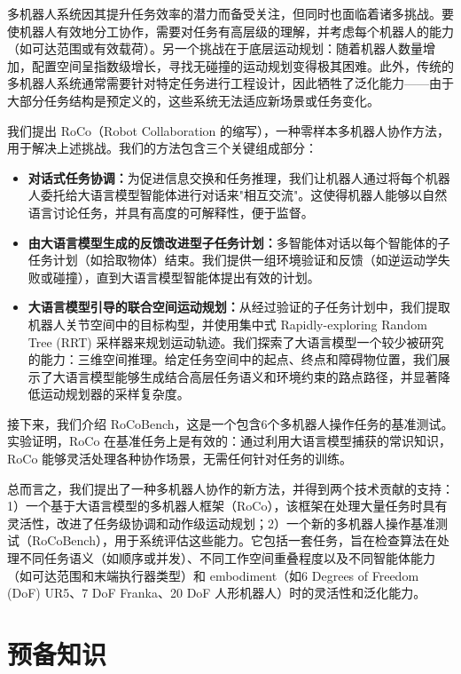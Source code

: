 \documentclass[UTF8, a4paper, 12pt]{article}
\begin{document}
多机器人系统因其提升任务效率的潜力而备受关注，但同时也面临着诸多挑战。要使机器人有效地分工协作，需要对任务有高层级的理解，并考虑每个机器人的能力（如可达范围或有效载荷）。另一个挑战在于底层运动规划：随着机器人数量增加，配置空间呈指数级增长，寻找无碰撞的运动规划变得极其困难。此外，传统的多机器人系统通常需要针对特定任务进行工程设计，因此牺牲了泛化能力——由于大部分任务结构是预定义的，这些系统无法适应新场景或任务变化。

我们提出 RoCo（Robot Collaboration 的缩写），一种零样本多机器人协作方法，用于解决上述挑战。我们的方法包含三个关键组成部分：

\begin{itemize}
    \item \textbf{对话式任务协调：}为促进信息交换和任务推理，我们让机器人通过将每个机器人委托给大语言模型智能体进行对话来"相互交流"。这使得机器人能够以自然语言讨论任务，并具有高度的可解释性，便于监督。
    
    \item \textbf{由大语言模型生成的反馈改进型子任务计划：}多智能体对话以每个智能体的子任务计划（如拾取物体）结束。我们提供一组环境验证和反馈（如逆运动学失败或碰撞），直到大语言模型智能体提出有效的计划。
    
    \item \textbf{大语言模型引导的联合空间运动规划：}从经过验证的子任务计划中，我们提取机器人关节空间中的目标构型，并使用集中式 Rapidly-exploring Random Tree (RRT) 采样器来规划运动轨迹。我们探索了大语言模型一个较少被研究的能力：三维空间推理。给定任务空间中的起点、终点和障碍物位置，我们展示了大语言模型能够生成结合高层任务语义和环境约束的路点路径，并显著降低运动规划器的采样复杂度。
\end{itemize}

接下来，我们介绍 RoCoBench，这是一个包含6个多机器人操作任务的基准测试。实验证明，RoCo 在基准任务上是有效的：通过利用大语言模型捕获的常识知识，RoCo 能够灵活处理各种协作场景，无需任何针对任务的训练。

总而言之，我们提出了一种多机器人协作的新方法，并得到两个技术贡献的支持：1）一个基于大语言模型的多机器人框架（RoCo），该框架在处理大量任务时具有灵活性，改进了任务级协调和动作级运动规划；2）一个新的多机器人操作基准测试（RoCoBench），用于系统评估这些能力。它包括一套任务，旨在检查算法在处理不同任务语义（如顺序或并发）、不同工作空间重叠程度以及不同智能体能力（如可达范围和末端执行器类型）和 embodiment（如6 Degrees of Freedom (DoF) UR5、7 DoF Franka、20 DoF 人形机器人）时的灵活性和泛化能力。

\section{预备知识}
\end{document}
